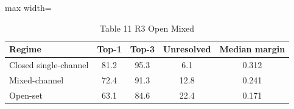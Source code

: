 \begin{table}[tbp]
\centering
\scriptsize
\caption{Table 11 R3 Open Mixed}
\label{tab:table_11_r3_open_mixed}
\begin{adjustbox}{max width=\linewidth}
\begin{tabular}{lcccc}
\toprule
Regime & Top-1 & Top-3 & Unresolved & Median margin \\
\midrule
Closed single-channel & 81.2 & 95.3 & 6.1 & 0.312 \\
Mixed-channel & 72.4 & 91.3 & 12.8 & 0.241 \\
Open-set & 63.1 & 84.6 & 22.4 & 0.171 \\
\bottomrule
\end{tabular}
\end{adjustbox}
\end{table}
